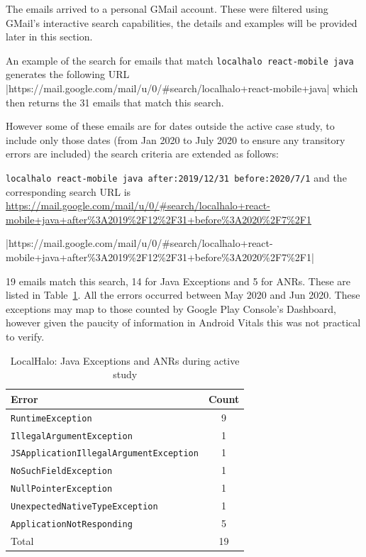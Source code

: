 
The emails arrived to a personal GMail account. These were filtered using GMail's interactive search capabilities, the details and examples will be provided later in this section. 

An example of the search for emails that match \texttt{localhalo react-mobile java} generates the following URL |https://mail.google.com/mail/u/0/#search/localhalo+react-mobile+java| which then returns the 31 emails that match this search. 

However some of these emails are for dates outside the active case study, to include only those dates (from  Jan 2020 to  July 2020 to ensure any transitory errors are included) the search criteria are extended as follows: 

\texttt{localhalo react-mobile java after:2019/12/31 before:2020/7/1} and the corresponding search URL is \url{https://mail.google.com/mail/u/0/#search/localhalo+react-mobile+java+after\%3A2019\%2F12\%2F31+before\%3A2020\%2F7\%2F1}

|https://mail.google.com/mail/u/0/#search/localhalo+react-mobile+java+after\%3A2019\%2F12\%2F31+before\%3A2020\%2F7\%2F1|

19 emails match this search, 14 for Java Exceptions and 5 for ANRs. These are listed in Table~\ref{tab:localhalo-sentry-java-errors-during-active-study}. All the errors occurred between  May 2020 and  Jun 2020. %
These exceptions may map to those counted by Google Play Console's Dashboard, however given the paucity of information in Android Vitals this was not practical to verify. 


\begin{table}
    \centering
    \footnotesize
    \captionsetup{font=scriptsize}
    \begin{tabular}{lc}
      Error  &  Count \\
      \toprule
      \texttt{RuntimeException} & 9 \\
      \texttt{IllegalArgumentException} & 1 \\
      \texttt{JSApplicationIllegalArgumentException} & 1 \\
      \texttt{NoSuchFieldException} &1 \\
      \texttt{NullPointerException} & 1 \\
      \texttt{UnexpectedNativeTypeException}  & 1 \\
      \midrule
      \texttt{ApplicationNotResponding} & 5 \\
      \midrule
      Total & 19 \\
      \bottomrule
    \end{tabular}
    \caption{LocalHalo: Java Exceptions and ANRs during active study}
    \label{tab:localhalo-sentry-java-errors-during-active-study}
\end{table}


